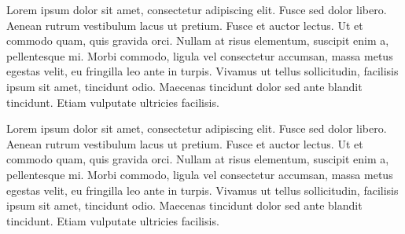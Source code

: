 \documentclass{book}
\begin{document}
\begin{pages}
\begin{Leftside}
\beginnumbering
{}

\pstart
Lorem ipsum dolor sit amet, consectetur adipiscing elit. Fusce sed dolor libero. Aenean rutrum vestibulum lacus ut pretium. Fusce et auctor lectus. Ut et commodo quam, quis gravida orci. Nullam at risus elementum, suscipit enim a, pellentesque mi. Morbi commodo, ligula vel consectetur accumsan, massa metus egestas velit, eu fringilla leo ante in turpis. Vivamus ut tellus sollicitudin, facilisis ipsum sit amet, tincidunt odio. Maecenas tincidunt dolor sed ante blandit tincidunt. Etiam vulputate ultricies facilisis.
\pend
\endnumbering




\end{Leftside}
\begin{Rightside}
\beginnumbering

\pstart
Lorem ipsum dolor sit amet, consectetur adipiscing elit. Fusce sed dolor libero. Aenean rutrum vestibulum lacus ut pretium. Fusce et auctor lectus. Ut et commodo quam, quis gravida orci. Nullam at risus elementum, suscipit enim a, pellentesque mi. Morbi commodo, ligula vel consectetur accumsan, massa metus egestas velit, eu fringilla leo ante in turpis. Vivamus ut tellus sollicitudin, facilisis ipsum sit amet, tincidunt odio. Maecenas tincidunt dolor sed ante blandit tincidunt. Etiam vulputate ultricies facilisis.
\pend
\endnumbering

\end{Rightside}
\Pages
\end{pages}
\end{document}
